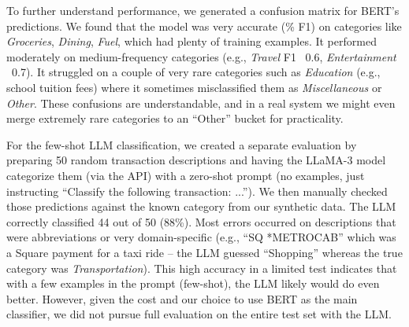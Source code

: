 \documentclass{scrartcl}
\begin{document}
To further understand performance, we generated a confusion matrix for BERT's predictions. We found that the model was very accurate (\% F1) on categories like \textit{Groceries}, \textit{Dining}, \textit{Fuel}, which had plenty of training examples. It performed moderately on medium-frequency categories (e.g., \textit{Travel} F1 ~0.6, \textit{Entertainment} ~0.7). It struggled on a couple of very rare categories such as \textit{Education} (e.g., school tuition fees) where it sometimes misclassified them as \textit{Miscellaneous} or \textit{Other}. These confusions are understandable, and in a real system we might even merge extremely rare categories to an “Other” bucket for practicality. 

For the few-shot LLM classification, we created a separate evaluation by preparing 50 random transaction descriptions and having the LLaMA-3 model categorize them (via the API) with a zero-shot prompt (no examples, just instructing “Classify the following transaction: ...”). We then manually checked those predictions against the known category from our synthetic data. The LLM correctly classified 44 out of 50 (88\%). Most errors occurred on descriptions that were abbreviations or very domain-specific (e.g., “SQ *METROCAB” which was a Square payment for a taxi ride – the LLM guessed “Shopping” whereas the true category was \textit{Transportation}). This high accuracy in a limited test indicates that with a few examples in the prompt (few-shot), the LLM likely would do even better. However, given the cost and our choice to use BERT as the main classifier, we did not pursue full evaluation on the entire test set with the LLM.
\end{document}
